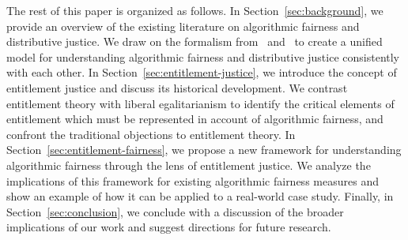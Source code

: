 The rest of this paper is organized as follows. In Section~\ref{sec:background},
we provide an overview of the existing literature on algorithmic fairness and
distributive justice. We draw on the formalism from~\citep{Kuppler_2021}
and~\citep{CorbettDavies_2023} to create a unified model for understanding
algorithmic fairness and distributive justice consistently with each other. 
In Section~\ref{sec:entitlement-justice}, we introduce the concept of
entitlement justice and discuss its historical development. We contrast
entitlement theory with liberal egalitarianism to identify the critical
elements of entitlement which must be represented in account of algorithmic
fairness, and confront the traditional objections to entitlement theory. In
Section~\ref{sec:entitlement-fairness}, we propose a new framework for
understanding algorithmic fairness through the lens of entitlement justice. We
analyze the implications of this framework for existing algorithmic fairness
measures and show an example of how it can be applied to a real-world case
study. Finally, in Section~\ref{sec:conclusion}, we conclude with a discussion
of the broader implications of our work and suggest directions for future
research.
